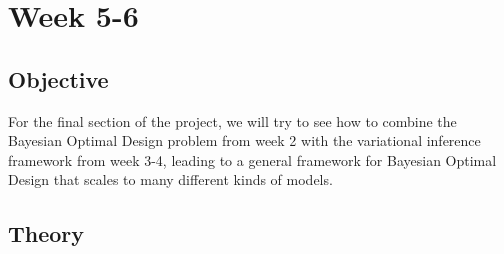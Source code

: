 \section{Week 5-6}
\subsection{Objective}
For the final section of the project, we will try to see how to combine the Bayesian Optimal Design problem from week 2 with the variational inference framework from week 3-4, 
leading to a general framework for Bayesian Optimal Design that scales to many different kinds of models.
\subsection{Theory}

